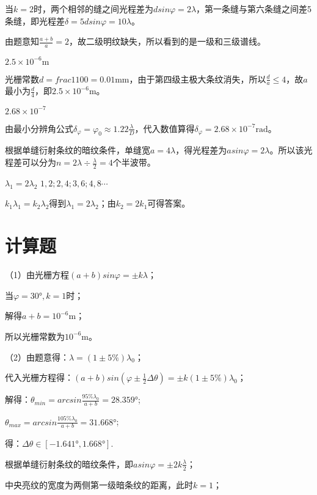 \solve
当$k=2$时，两个相邻的缝之间光程差为$dsin\varphi=2\lambda$，第一条缝与第六条缝之间差5条缝，即光程差$\delta=5dsin\varphi=10\lambda$。

 

\solve
由题意知$\frac{a+b}{a}=2$，故二级明纹缺失，所以看到的是一级和三级谱线。

\exercise $2.5\times10^{-6}\mathrm{m}$

\solve
光栅常数$d=frac{1}{100}=0.01\mathrm{mm}$，由于第四级主极大条纹消失，所以$\frac{d}{a}\leq 4$，故$a$最小为$\frac{d}{4}$，即$2.5\times10^{-6}\mathrm{m}$。

\exercise $2.68\times10^{-7}$

\solve
由最小分辨角公式$\delta_\varphi=\varphi_0\approx1.22\frac{\lambda}{D}$，代入数值算得$\delta_\varphi=2.68\times10^{-7}\mathrm{rad}$。


\solve
根据单缝衍射条纹的暗纹条件，单缝宽$a=4\lambda$，得光程差为$asin\varphi=2\lambda$。所以该光程差可以分为$n=2\lambda\div\frac{\lambda}{2}=4$个半波带。

\exercise $\lambda_1=2\lambda_2$ \quad $1,2;2,4;3,6;4,8\cdots$

\solve
$k_1\lambda_1=k_2\lambda_2$得到$\lambda_1=2\lambda_2$；由$k_2=2k_1$可得答案。

\section{计算题}
\exercise

\solve
（1）由光栅方程$(a+b)sin\varphi=\pm k\lambda$；

当$\varphi=30°,k=1$时；

解得$a+b=10^{-6}\mathrm{m}$；

所以光栅常数为$10^{-6}\mathrm{m}$。

（2）由题意得：$\lambda=(1\pm5\% ) \lambda_0$；

代入光栅方程得：$(a+b)sin(\varphi\pm\frac{1}{2}\Delta\theta)=\pm k(1\pm5\%)\lambda_0$；

解得：$\theta_{min}=arcsin\frac{95\%\lambda_0}{a+b}=28.359°$;

$\theta_{max}=arcsin\frac{105\%\lambda_0}{a+b}=31.668°$;

得：$\Delta\theta\in[-1.641°,1.668°]$.

\exercise

\solve
根据单缝衍射条纹的暗纹条件，即$asin\varphi=\pm2k\frac{\lambda}{2}$；

中央亮纹的宽度为两侧第一级暗条纹的距离，此时$k=1$；


